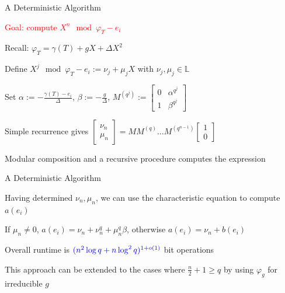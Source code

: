 \documentclass{beamer}
\newcommand{\blue}{\textcolor{blue}}
\newcommand{\red}{\textcolor{red}}
\begin{document}
\begin{frame}{A Deterministic Algorithm}

\item \red{Goal: compute $X^n \mod \varphi_{T} - e_i$}
\item Recall: $\varphi_T = \gamma(T) + gX + \Delta X^2$
    
    \item Define $X^j \mod \varphi_{T} - e_i := \nu_j + \mu_j X $ with $\nu_j, \mu_j \in \mathbb{L}$
    
    \item Set $\alpha := -\frac{\gamma(T) - e_i}{\Delta}$, $\beta := - \frac{g}{\Delta}$, $M^{(q^j)} := \begin{bmatrix} 0 & \alpha^{q^j} \\ 1 & \beta^{q^j} \end{bmatrix}$
    
    \item Simple recurrence gives $\begin{bmatrix} \nu_{n} \\ \mu_n  \end{bmatrix} = M M^{(q)} \ldots M^{(q^{n-1})}  \begin{bmatrix} 1 \\ 0  \end{bmatrix}$
    
    \item Modular composition and a recursive procedure computes the expression 

    
\end{frame}


\begin{frame}{A Deterministic Algorithm}

    \item Having determined $\nu_n, \mu_n$, we can use the characteristic equation to compute $a(e_i)$
        \item If $\mu_n \neq 0$, $a(e_i) = \nu_n + \nu_n^q + \mu_n^q \beta$, otherwise $a(e_i) = \nu_n + b(e_i)$
    \item Overall runtime is $\blue{(n^2 \log q + n \log^2 q)^{1+o(1)}}$ bit operations

    \item This approach can be extended to the cases where $\frac{n}{2} + 1 \geq q$ by using $\varphi_{g}$ for irreducible $g$

    
\end{frame}
\end{document}
